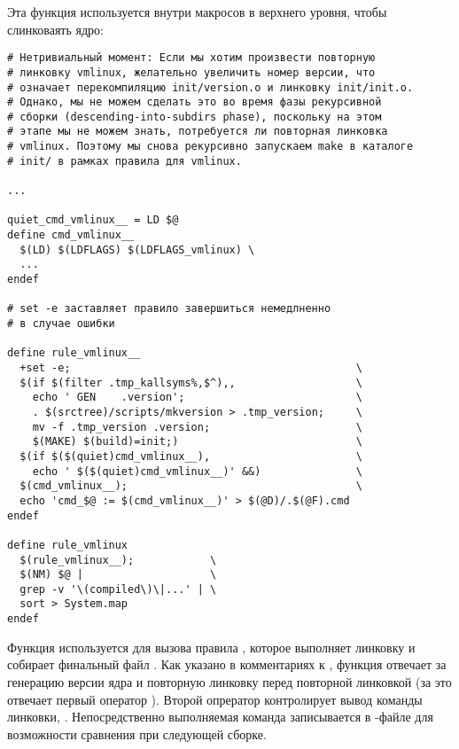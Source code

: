 Эта функция используется внутри макросов в  верхнего
уровня, чтобы слинковаять ядро:

\begin{verbatim}
# Нетривиальный момент: Если мы хотим произвести повторную
# линковку vmlinux, желательно увеличить номер версии, что
# означает перекомпиляцию init/version.o и линковку init/init.o.
# Однако, мы не можем сделать это во время фазы рекурсивной
# сборки (descending-into-subdirs phase), поскольку на этом
# этапе мы не можем знать, потребуется ли повторная линковка
# vmlinux. Поэтому мы снова рекурсивно запускаем make в каталоге
# init/ в рамках правила для vmlinux.

...

quiet_cmd_vmlinux__ = LD $@
define cmd_vmlinux__
  $(LD) $(LDFLAGS) $(LDFLAGS_vmlinux) \
  ...
endef

# set -e заставляет правило завершиться немедлненно
# в случае ошибки

define rule_vmlinux__
  +set -e;                                             \
  $(if $(filter .tmp_kallsyms%,$^),,                   \
    echo ' GEN    .version';                           \
    . $(srctree)/scripts/mkversion > .tmp_version;     \
    mv -f .tmp_version .version;                       \
    $(MAKE) $(build)=init;)                            \
  $(if $($(quiet)cmd_vmlinux__),                       \
    echo ' $($(quiet)cmd_vmlinux__)' &&)               \
  $(cmd_vmlinux__);                                    \
  echo 'cmd_$@ := $(cmd_vmlinux__)' > $(@D)/.$(@F).cmd
endef

define rule_vmlinux
  $(rule_vmlinux__);            \
  $(NM) $@ |                    \
  grep -v '\(compiled\)\|...' | \
  sort > System.map
endef
\end{verbatim}

Функция \function{if\_changed\_rule} используется для вызова правила
\function{rule\_vmlinux}, которое выполняет линковку и собирает
финальный файл . Как указано в комментариях к
, функция  отвечает за
генерацию версии ядра и повторную линковку  перед
повторной линковкой  (за это отвечает первый
оператор ). Второй опрератор \function{if} контролирует
вывод команды линковки,
. Непосредственно выполняемая команда
записывается в -файле для возможности сравнения при
следующей сборке.
